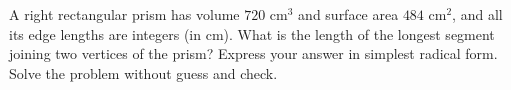 A right rectangular prism has volume $720\text{ cm}^3$ and surface area $484\text{ cm}^2$, and all its edge lengths are integers (in cm). What is the length of the longest segment joining two vertices of the prism? Express your answer in simplest radical form. Solve the problem without guess and check.
